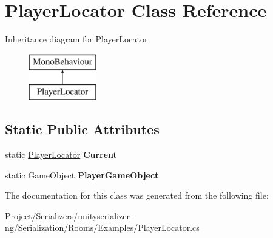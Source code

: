 \hypertarget{class_player_locator}{}\section{Player\+Locator Class Reference}
\label{class_player_locator}
Inheritance diagram for Player\+Locator\+:\begin{figure}[H]
\begin{center}
\leavevmode
\includegraphics[height=2.000000cm]{class_player_locator}
\end{center}
\end{figure}
\subsection*{Static Public Attributes}
\begin{DoxyCompactItemize}
\item 
\mbox{\label{class_player_locator_a9e9c8c303c416556dfecd45067f48fae}} 
static \hyperlink{class_player_locator}{Player\+Locator} {\bfseries Current}
\item 
\mbox{\label{class_player_locator_a38ead089d27d49efa91465b756f9bc08}} 
static Game\+Object {\bfseries Player\+Game\+Object}
\end{DoxyCompactItemize}


The documentation for this class was generated from the following file\+:\begin{DoxyCompactItemize}
\item 
Project/\+Serializers/unityserializer-\/ng/\+Serialization/\+Rooms/\+Examples/Player\+Locator.\+cs\end{DoxyCompactItemize}
